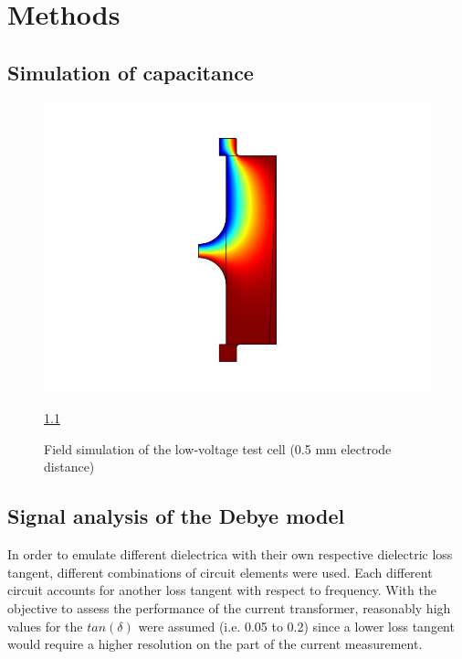 \chapter{Methods}

\section{Simulation of capacitance} \label{sec.analysecurrent}

\begin{figure}[htbp]
	\centering
	\includegraphics{figures/COMSOL_Beispielbild.jpg}		
	\caption[Kurze Abbildungsbeschreibung]{Field simulation of the low-voltage test cell (0.5 mm electrode distance)} \ref{sec.analysecurrent}
	\label{fig.waveforms}
\end{figure}


\section{Signal analysis of the Debye model}

In order to emulate different dielectrica with their own respective dielectric loss tangent, different
combinations of circuit elements were used. Each different circuit accounts for another loss tangent
with respect to frequency. With the objective to assess the performance of the current transformer, reasonably high values for the $tan\left(\delta\right)$ were assumed
(i.e. 0.05 to 0.2) since a lower loss tangent would require a higher resolution on the part of the current measurement.

